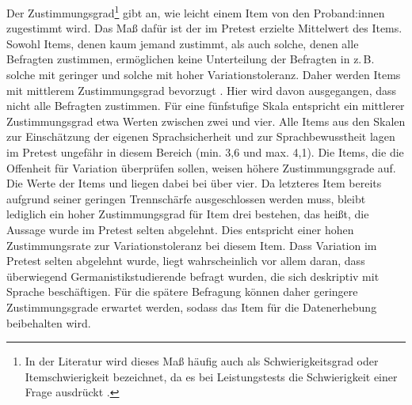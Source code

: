 Der Zustimmungsgrad\footnote{In der Literatur wird dieses Maß häufig auch als Schwierigkeitsgrad oder Itemschwierigkeit bezeichnet, da es bei Leistungstests die Schwierigkeit einer Frage ausdrückt \citep[s.][476]{Doring2016}.} gibt an, wie leicht einem Item von den Proband:innen zugestimmt wird. Das Maß dafür ist der im Pretest erzielte Mittelwert des Items. 
Sowohl Items, denen kaum jemand zustimmt, als auch solche, denen alle Befragten zustimmen, ermöglichen keine Unterteilung der Befragten in z.\,B. solche mit geringer und solche mit hoher Variationstoleranz. 
Daher werden Items mit mittlerem Zustimmungsgrad bevorzugt \citep[s.][477]{Doring2016}. 
Hier wird davon ausgegangen, dass nicht alle Befragten zustimmen. %
Für eine fünfstufige Skala entspricht ein mittlerer Zustimmungsgrad etwa Werten zwischen zwei und vier. 
Alle Items aus den Skalen zur Einschätzung der eigenen Sprachsicherheit und zur Sprachbewusstheit lagen im Pretest ungefähr in diesem Bereich (min. 3,6 und max. 4,1). 
Die Items, die die Offenheit für Variation überprüfen sollen, weisen höhere Zustimmungsgrade auf. 
Die Werte der Items  und  liegen dabei bei über vier. 
Da letzteres Item bereits aufgrund seiner geringen Trennschärfe ausgeschlossen werden muss, bleibt lediglich ein hoher Zustimmungsgrad für Item drei bestehen, das heißt, die Aussage  wurde im Pretest selten abgelehnt. 
Dies entspricht einer hohen Zustimmungsrate zur Variationstoleranz bei diesem Item. 
Dass Variation im Pretest selten abgelehnt wurde, liegt wahrscheinlich vor allem daran, dass überwiegend Germanistikstudierende befragt wurden, die sich deskriptiv mit Sprache beschäftigen. 
Für die spätere Befragung können daher geringere Zustimmungsgrade erwartet werden, sodass das Item für die Datenerhebung beibehalten wird. %

